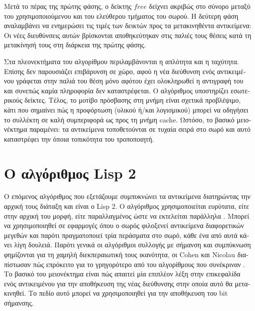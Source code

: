 \begin{greek}
Μετά το πέρας της πρώτης φάσης, ο δείκτης $free$ δείχνει ακριβώς στο σύνορο μεταξύ του 
χρησιμοποιούμενου και του ελεύθερου τμήματος του σωρού. Η δεύτερη φάση αναλαμβάνει να 
ενημερώσει τις τιμές των δεικτών προς τα μετακινηθέντα αντικείμενα: Οι νέες διευθύνσεις 
αυτών βρίσκονται αποθηκεύτηκαν στις παλιές τους θέσεις κατά τη μετακίνησή τους στη 
διάρκεια της πρώτης φάσης.

Στα πλεονεκτήματα του αλγορίθμου περιλαμβάνονται η απλότητα και η ταχύτητα. Επίσης δεν 
παρουσιάζει επιβάρυνση σε χώρο, αφού η νέα διεύθυνση ενός αντικειμένου γράφεται στην παλιά 
του θέση μόνο αφότου έχει ολοκληρωθεί η αντιγραφή του και συνεπώς καμία πληροφορία δεν 
καταστρέφεται. Ο αλγόριθμος υποστηρίζει εσωτερικούς δείκτες. Τέλος, το μοτίβο πρόσβασης 
στη μνήμη είναι σχετικά προβλέψιμο, κάτι που σημαίνει πώς η προφόρτωση (υλικού ή/και 
λογισμικού) μπορεί να οδηγήσει το συλλέκτη σε καλή συμπεριφορά ως προς τη μνήμη cache. 
Ωστόσο, το βασικό μειονέκτημα παραμένει: τα αντικείμενα τοποθετούνται σε τυχαία σειρά στο 
σωρό και αυτό καταστρέφει την όποια τοπικότητα του τροποποιητή.

\section{Ο αλγόριθμος Lisp 2}
Ο επόμενος αλγόριθμος που εξετάζουμε συμπυκνώνει τα αντικείμενα διατηρώντας την αρχική 
τους διάταξη και είναι ο Lisp 2. Ο αλγόριθμος χρησιμοποιείται ευρύτατα, είτε στην αρχική 
του μορφή, είτε παραλλαγμένος ώστε να εκτελείται παράλληλα \cite{DBLP:conf/jvm/FloodDSZ01}. 
Μπορεί να χρησιμοποιηθεί σε εφαρμογές όπου ο σωρός φιλοξενεί αντικείμενα διαφορετικών 
μεγεθών και παρότι πραγματοποιεί τρία περάσματα στο σωρό, κάθε ένα από αυτά κάνει λίγη 
δουλειά. Παρότι γενικά οι αλγόριθμοι συλλογής με σήμανση και συμπύκνωση φημίζονται για τη 
χαμηλή διεκπεραιωτική τους ικανότητα, οι Cohen και Nicolau διαπίστωσαν πώς επρόκειτο για 
το γρηγορότερο από του αλγορίθμους που συνέκριναν \cite{DBLP:journals/toplas/CohenN83}.
Το βασικό του μειονέκτημα είναι πώς απαιτεί μία επιπλέον λέξη στην επικεφαλίδα ενός 
αντικειμένου για την αποθήκευση της νέας διεύθυνσης στην οποία αυτό θα μετακινηθεί. Το 
πεδίο αυτό μπορεί να χρησιμοποιηθεί για την αποθήκευση του bit σήμανσης.


\end{greek}
